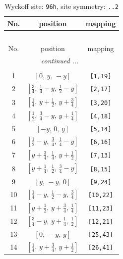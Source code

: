 \documentclass[fleqn,8pt]{jsarticle}
\begin{document}
\begin{longtable}{ccc}
\caption{Wyckoff site: {\tt 96h}, site symmetry: {\tt ..2}}
 \\
 \hline \hline
No. & position & mapping \\ \hline \endfirsthead

\multicolumn{2}{l}{\tablename\ \thetable{}} \\
 \hline \hline
No. & position & mapping \\ \hline \endhead

 \hline \hline
\multicolumn{2}{r}{\footnotesize\it continued ...} \\ \endfoot

 \hline \hline
\multicolumn{2}{r}{} \\ \endlastfoot

1 & $\left[ 0,\, y,\, - y \right]$ & {\tt [1,19]} \\ \hline
2 & $\left[ \frac{3}{4},\, \frac{1}{4} - y,\, \frac{1}{2} - y \right]$ & {\tt [2,17]} \\ \hline
3 & $\left[ \frac{1}{4},\, y + \frac{1}{2},\, y + \frac{3}{4} \right]$ & {\tt [3,20]} \\ \hline
4 & $\left[ \frac{1}{2},\, \frac{3}{4} - y,\, y + \frac{1}{4} \right]$ & {\tt [4,18]} \\ \hline
5 & $\left[ - y,\, 0,\, y \right]$ & {\tt [5,14]} \\ \hline
6 & $\left[ \frac{1}{2} - y,\, \frac{3}{4},\, \frac{1}{4} - y \right]$ & {\tt [6,16]} \\ \hline
7 & $\left[ y + \frac{3}{4},\, \frac{1}{4},\, y + \frac{1}{2} \right]$ & {\tt [7,13]} \\ \hline
8 & $\left[ y + \frac{1}{4},\, \frac{1}{2},\, \frac{3}{4} - y \right]$ & {\tt [8,15]} \\ \hline
9 & $\left[ y,\, - y,\, 0 \right]$ & {\tt [9,24]} \\ \hline
10 & $\left[ \frac{1}{4} - y,\, \frac{1}{2} - y,\, \frac{3}{4} \right]$ & {\tt [10,22]} \\ \hline
11 & $\left[ y + \frac{1}{2},\, y + \frac{3}{4},\, \frac{1}{4} \right]$ & {\tt [11,23]} \\ \hline
12 & $\left[ \frac{3}{4} - y,\, y + \frac{1}{4},\, \frac{1}{2} \right]$ & {\tt [12,21]} \\ \hline
13 & $\left[ 0,\, - y,\, y \right]$ & {\tt [25,43]} \\ \hline
14 & $\left[ \frac{1}{4},\, y + \frac{3}{4},\, y + \frac{1}{2} \right]$ & {\tt [26,41]} \\ \hline

\end{longtable}
\end{document}
